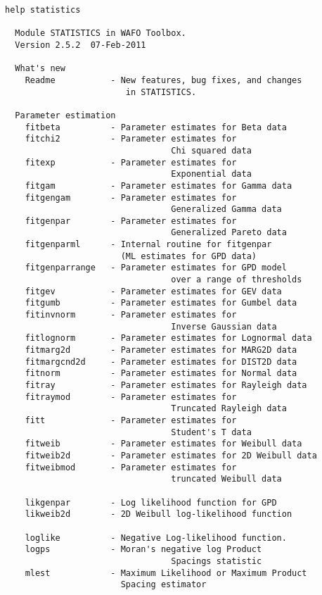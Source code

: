 {\small\begin{verbatim}
help statistics

  Module STATISTICS in WAFO Toolbox.
  Version 2.5.2  07-Feb-2011

  What's new
    Readme           - New features, bug fixes, and changes
                        in STATISTICS.

  Parameter estimation
    fitbeta          - Parameter estimates for Beta data
    fitchi2          - Parameter estimates for
                                 Chi squared data
    fitexp           - Parameter estimates for
                                 Exponential data
    fitgam           - Parameter estimates for Gamma data
    fitgengam        - Parameter estimates for
                                 Generalized Gamma data
    fitgenpar        - Parameter estimates for
                                 Generalized Pareto data
    fitgenparml      - Internal routine for fitgenpar
                       (ML estimates for GPD data)
    fitgenparrange   - Parameter estimates for GPD model
                                 over a range of thresholds
    fitgev           - Parameter estimates for GEV data
    fitgumb          - Parameter estimates for Gumbel data
    fitinvnorm       - Parameter estimates for
                                 Inverse Gaussian data
    fitlognorm       - Parameter estimates for Lognormal data
    fitmarg2d        - Parameter estimates for MARG2D data
    fitmargcnd2d     - Parameter estimates for DIST2D data
    fitnorm          - Parameter estimates for Normal data
    fitray           - Parameter estimates for Rayleigh data
    fitraymod        - Parameter estimates for
                                 Truncated Rayleigh data
    fitt             - Parameter estimates for
                                 Student's T data
    fitweib          - Parameter estimates for Weibull data
    fitweib2d        - Parameter estimates for 2D Weibull data
    fitweibmod       - Parameter estimates for
                                 truncated Weibull data

    likgenpar        - Log likelihood function for GPD
    likweib2d        - 2D Weibull log-likelihood function

    loglike          - Negative Log-likelihood function.
    logps            - Moran's negative log Product
                                 Spacings statistic
    mlest            - Maximum Likelihood or Maximum Product
                       Spacing estimator


\end{verbatim}}
